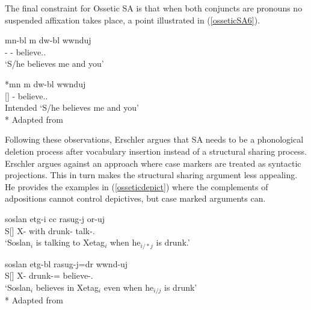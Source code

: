 The final constraint for Ossetic SA is that when both conjuncts are pronouns no suspended affixation takes place, a point illustrated in (\ref{osseticSA6}).

\begin{exe}
    \ex \label{osseticSA6}
    \begin{xlist}
    \ex \gll 
    {m\textturna n-b\textturna l} {\textturna m\textturna} {d\textturna w-b\textturna l} {\textturna ww\textturna nduj} \\ {\Fsg}-{\Sup} {\And} {\Ssg}-{\Sup} believe.{\Prs}.{\Third}{\Sg} \\
    \glt `S/he believes me and you'
    
    \ex \gll 
    {*m\textturna n} {\textturna m\textturna} {d\textturna w-b\textturna l} {\textturna ww\textturna nduj} \\ {\Fsg}[{\Obl}] {\And} {\Ssg}-{\Sup} believe.{\Prs}.{\Third}{\Sg} \\
    \glt Intended `S/he believes me and you'\\*
    \hfill Adapted from \cite{erschler2012suspended}
    \end{xlist}
\end{exe}

Following these observations, Erschler argues that SA needs to be a phonological deletion process after vocabulary insertion instead of a structural sharing process. Erschler argues against an approach where case markers are treated as syntactic projections. This in turn makes the structural sharing argument less appealing. He provides the examples in (\ref{osseticdepict}) where the complements of adpositions cannot control depictives, but case marked arguments can.

\begin{exe}
    \ex \label{osseticdepict}
    \begin{xlist}
        \ex \gll 
        {soslan} {\textchi et\textturna g-i} {\textchi\textturna cc\textturna} {rasug-\textturna j} {\textdzlig or-uj} \\ S[{\Nom}] X-{\Obl} with drunk-{\Abl} talk-{\Prs}.{\Third}{\Sg} \\
        \glt `Soslan$_i$ is talking to Xetag$_i$ when he$_{i/*j}$ is drunk.'
    
        \ex \gll 
        {soslan} {\textchi et\textturna g-b\textturna l} {rasug-\textturna j=d\textturna r} {\textturna ww\textturna nd-uj} \\ S[{\Nom}] X-{\Sup} drunk-{\Abl}={\Emp} believe-{\Prs}.{\Third}{\Sg} \\
        \glt `Soslan$_i$ believes in Xetag$_i$ even when he$_{i/j}$ is drunk'\\*
        \hfill Adapted from \cite{erschler2012suspended}
    \end{xlist}
\end{exe}

